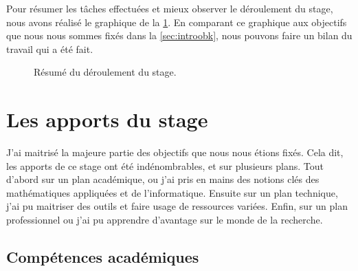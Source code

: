 \vspace*{0.50cm}
Pour résumer les tâches effectuées et mieux observer le déroulement du stage, nous avons réalisé le graphique de la \cref{fig:timeline}. En comparant ce graphique aux objectifs que nous nous sommes fixés dans la \cref{sec:introobk}, nous pouvons faire un bilan du travail qui a été fait.

\begin{figure}[!h]
    \centering
    \caption{Résumé du déroulement du stage.}
    \label{fig:timeline}
\end{figure}








\section{Les apports du stage}


J'ai maitrisé la majeure partie des objectifs que nous nous étions fixés. Cela dit, les apports de ce stage ont été indénombrables, et sur plusieurs plans. Tout d'abord sur un plan académique, ou j'ai pris en mains des notions clés des mathématiques appliquées et de l'informatique. Ensuite sur un plan technique, j'ai pu maitriser des outils et faire usage de ressources variées. Enfin, sur un plan professionnel ou j'ai pu apprendre d'avantage sur le monde de la recherche.



\subsection{Compétences académiques}

